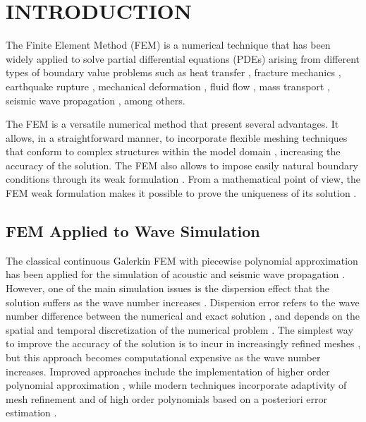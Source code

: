 %
%
%
%



\pagestyle{plain} %
\setcounter{page}{1}

\chapter{\uppercase {Introduction}}
The Finite Element Method (FEM)  is  a numerical technique that has been widely applied to solve partial differential equations (PDEs) arising from different types of boundary value problems such as heat transfer \cite{Reddy2010}, fracture mechanics \cite{Kuna2013}, earthquake rupture \cite{Duan2006}, mechanical deformation \cite{Lewis1998}, fluid flow  \cite{Hughes1986, Aarnes2008},  mass transport \cite{Sudicky1989}, seismic wave propagation \cite{Ham2012, Gao2015},  among others. 

The FEM  is a versatile numerical method that present several advantages.  It allows, in a straightforward manner, to incorporate flexible meshing techniques that conform to complex structures within the model domain \cite{DeBasabe2009, Frehner2008}, increasing the accuracy of the solution. The FEM also allows to impose easily natural boundary conditions through its weak formulation \cite{Brenner2008}. From a mathematical point of view, the FEM weak formulation makes it possible to prove the  uniqueness of its solution \cite{Brenner2008}. 

\section{FEM Applied to Wave Simulation}
The classical  continuous Galerkin FEM  with piecewise polynomial approximation has been applied for the simulation of acoustic  and seismic wave propagation \cite{Marfurt1984, Mullen1982}.  However,  one of the main simulation issues is the dispersion effect that the solution suffers as the wave number increases  \cite{Deraemaeker1999, Ihlenburg1995a}. Dispersion error  refers to the wave number difference between the numerical and exact solution \cite{Deraemaeker1999}, and depends on the spatial and temporal discretization of the numerical problem \cite{DeBasabe2007}.  The  simplest  way to improve the accuracy of the solution is to incur in increasingly  refined meshes \cite{Ihlenburg1995},  but  this approach  becomes  computational expensive  as the  wave number increases. Improved approaches include the  implementation of higher order polynomial approximation \cite{Esterhazy2017, Ihlenburg1997}, while modern techniques incorporate adaptivity of mesh refinement and of high order polynomials based on a posteriori error estimation \cite{Bangerth2009, Demkowicz1989}.

